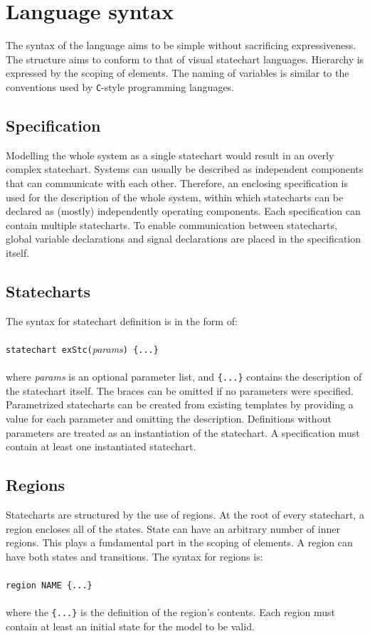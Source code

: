 \section{Language syntax}
The syntax of the language aims to be simple without sacrificing expressiveness. The structure aims to conform to that of visual statechart languages. Hierarchy is expressed by the scoping of elements. The naming of variables is similar to the conventions used by \verb!C!-style programming languages.
  \subsection{Specification}
Modelling the whole system as a single statechart would result in an overly complex statechart. Systems can usually be described as independent components that can communicate with each other. Therefore, an enclosing specification is used for the description of the whole system, within which statecharts can be declared as (mostly) independently operating components. Each specification can contain multiple statecharts. To enable communication between statecharts, global variable declarations and signal declarations are placed in the specification itself.
  \subsection{Statecharts}
The syntax for statechart definition is in the form of:
\\\\\verb!statechart exStc(!\textit{params}\verb!) {...}!\\\\
where \textit{params} is an optional parameter list, and \verb!{...}! contains the description of the statechart itself. The braces can be omitted if no parameters were specified. Parametrized statecharts can be created from existing templates by providing a value for each parameter and omitting the description. Definitions without parameters are treated as an instantiation of the statechart. A specification must contain at least one instantiated statechart.
  \subsection{Regions}
Statecharts are structured by the use of regions. At the root of every statechart, a region encloses all of the states. State can have an arbitrary number of inner regions. This plays a fundamental part in the scoping of elements. A region can have both states and transitions. The syntax for regions is:
\\\\\verb!region NAME {...}!\\\\
where the \verb!{...}! is the definition of the region's contents. Each region must contain at least an initial state for the model to be valid.
